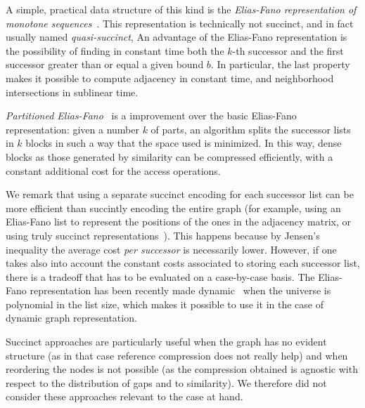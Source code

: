 A simple, practical data structure of this kind is the \emph{Elias-Fano
representation of monotone sequences}~\cite{EliESRCASF}. This representation
is technically not succinct, and in fact usually named \emph{quasi-succinct},
An advantage of the
Elias-Fano representation is the possibility of finding in constant time both
the $k$-th successor and the first successor greater than or equal a
given bound $b$. In particular, the last property makes it possible to compute
adjacency in constant time, and neighborhood intersections in sublinear time.

\emph{Partitioned Elias-Fano}~\cite{OtVPEFI} is a improvement over the basic
Elias-Fano representation: given a number $k$ of parts, an algorithm splits
the successor lists in $k$ blocks in such a way that the space used is
minimized. In this way, dense blocks as those generated by similarity can be
compressed efficiently, with a constant additional cost for the access
operations.

We remark that using a separate succinct encoding for each successor list can
be more efficient than succintly encoding the entire graph (for example, using
an Elias-Fano list to represent the positions of the ones in the adjacency
matrix, or using truly succinct representations~\cite{FaMSEAG}). This happens
because by Jensen's inequality the average cost \emph{per successor} is
necessarily lower.  However, if one takes also into account the constant costs
associated to storing each successor list, there is a tradeoff that has to be
evaluated on a case-by-case basis.  The Elias-Fano representation has been
recently made dynamic~\cite{PiVDEFR} when the universe is polynomial in the
list size, which makes it possible to use it in the case of dynamic graph
representation.

Succinct approaches are particularly useful when the graph has no evident
structure (as in that case reference compression does not really help) and when
reordering the nodes is not possible (as the compression obtained is agnostic
with respect to the distribution of gaps and to similarity). We therefore did
not consider these approaches relevant to the case at hand.
